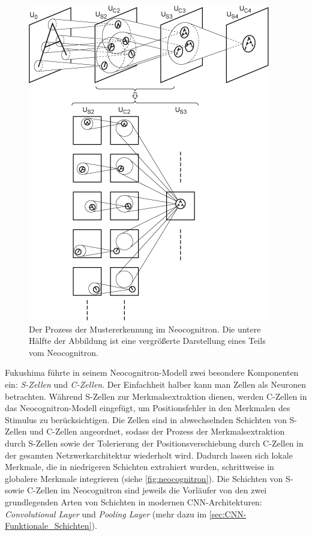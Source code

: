 \begin{description}
	\begin{figure}[!hb]
		\centering
		\includegraphics[width=0.72\linewidth]{images/Neocognitron}
		\caption{Der Prozess der Mustererkennung im Neocognitron. Die untere Hälfte der Abbildung ist eine vergrößerte Darstellung eines Teils vom Neocognitron. \protect\cite{neocognitron:scholarpediafig2}}
		\label{fig:neocognitron}
	\end{figure}

	Fukushima führte in seinem Neocognitron-Modell zwei besondere Komponenten ein: \emph{S-Zellen} und \emph{C-Zellen}. Der Einfachheit halber kann man Zellen als Neuronen betrachten. Während S-Zellen zur Merkmalsextraktion dienen, werden C-Zellen in das Neocognitron-Modell eingefügt, um Positionsfehler in den Merkmalen des Stimulus zu berücksichtigen. Die Zellen sind in abwechselnden Schichten von S-Zellen und C-Zellen angeordnet, sodass der Prozess der Merkmalsextraktion durch S-Zellen sowie der Tolerierung der Positionsverschiebung durch C-Zellen in der gesamten Netzwerkarchitektur wiederholt wird. Dadurch lassen sich lokale Merkmale, die in niedrigeren Schichten extrahiert wurden, schrittweise in globalere Merkmale integrieren (siehe \autoref{fig:neocognitron}). Die Schichten von S- sowie C-Zellen im Neocognitron sind jeweils die Vorläufer von den zwei grundlegenden Arten von Schichten in modernen CNN-Architekturen: \emph{Convolutional Layer} und \emph{Pooling Layer} (mehr dazu im \autoref{sec:CNN-Funktionale_Schichten}).
	

\end{description}
